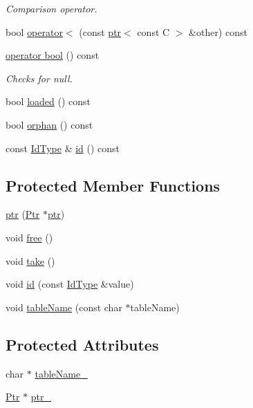 \begin{DoxyCompactItemize}
\begin{DoxyCompactList}\small\item\em Comparison operator. \end{DoxyCompactList}\item 
bool \hyperlink{classdbo_1_1ptr_a313ecb8531dcac45969342d26da9e0d9}{operator$<$} (const \hyperlink{classdbo_1_1ptr}{ptr}$<$ const C $>$ \&other) const 
\item 
\hyperlink{classdbo_1_1ptr_a72f14c0fec82d1a42ea26d978abaf16e}{operator bool} () const 
\begin{DoxyCompactList}\small\item\em Checks for null. \end{DoxyCompactList}\item 
bool \hyperlink{classdbo_1_1ptr_ab78eab684add44b9fcf6707b562fbf99}{loaded} () const 
\item 
bool \hyperlink{classdbo_1_1ptr_a838311b9897fad3559624d5d83b693a1}{orphan} () const 
\item 
const \hyperlink{classdbo_1_1ptr_a01fdb2e2c0743eb8bd1b822ccc8d4cd4}{Id\+Type} \& \hyperlink{classdbo_1_1ptr_a4de5c28173ca5ade1f7d4a8477d15c0f}{id} () const 
\end{DoxyCompactItemize}
\subsection*{Protected Member Functions}
\begin{DoxyCompactItemize}
\item 
\hyperlink{classdbo_1_1ptr_aaf763715686e40657a744d123b6fd9f8}{ptr} (\hyperlink{structdbo_1_1ptr_1_1_ptr}{Ptr} $\ast$\hyperlink{classdbo_1_1ptr}{ptr})
\item 
void \hyperlink{classdbo_1_1ptr_a792c1c28c473022d02e44c7ce9cfea6c}{free} ()
\item 
void \hyperlink{classdbo_1_1ptr_a0bcf503ebd97de9f203d884d24265789}{take} ()
\item 
void \hyperlink{classdbo_1_1ptr_a36439c82039e32a37fd149d8c54f7ee0}{id} (const \hyperlink{classdbo_1_1ptr_a01fdb2e2c0743eb8bd1b822ccc8d4cd4}{Id\+Type} \&value)
\item 
void \hyperlink{classdbo_1_1ptr_ace8682a6aa620ddb5b664f19cbb63af8}{table\+Name} (const char $\ast$table\+Name)
\end{DoxyCompactItemize}
\subsection*{Protected Attributes}
\begin{DoxyCompactItemize}
\item 
char $\ast$ \hyperlink{classdbo_1_1ptr_aa021e5c70d53414dfbb3139ce3661b9d}{table\+Name\+\_\+}
\item 
\hyperlink{structdbo_1_1ptr_1_1_ptr}{Ptr} $\ast$ \hyperlink{classdbo_1_1ptr_a7c58e1f0ae8dcf8a7a9acd6197d2de38}{ptr\+\_\+}
\end{DoxyCompactItemize}
